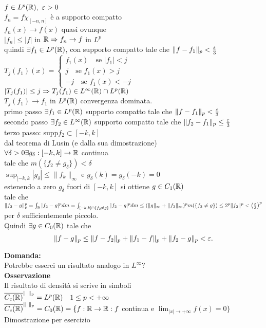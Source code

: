 \documentclass[12px]{article}
\begin{document}
	\begin{dimo}
		$f\in L^p(\mathbb{R}), \ \varepsilon > 0 $\\
		$f_n = f\chi_{[-n,n]}$ è a supporto compatto\\
		 $f_n(x) \rightarrow f(x)$ quasi ovunque\\
		 $|f_n| \leq |f|$ in  $\mathbb{R} \Rightarrow  f_n \rightarrow f$ in $L^p$\\
		 quindi  $\exists  f_1\in L^p(\mathbb{R})$, con supporto compatto tale che $\|f-f_1\|_p < \frac {\varepsilon} 3$ \\
		 $T_j(f_1)(x) = \begin{cases}
			 f_1 (x)\ \ \ \text{ se } |f_1| < j\\
			 j \ \ \ \text{ se } f_1(x) > j\\
			 -j \ \ \ \text{ se } f_1(x) < -j
		 \end{cases}$\\
		 $|T_j(f_1)|\leq j \Rightarrow  T_j (f_1)\in L^\infty (\mathbb{R})\cap L^p(\mathbb{R})$ \\
		 $T_j(f_1) \rightarrow f_1$ in $L^p(\mathbb{R})$ convergenza dominata.\\
		 primo passo  $\exists f_1\in L^p(\mathbb{R})$ supporto compatto tale che $\|f-f_1\|_p < \frac {\varepsilon} 3$\\
		 secondo passo $\exists f_2 \in L^\infty(\mathbb{R})$ supporto compatto tale che $\|f_2- f_1\|_p \leq \frac{\varepsilon} 3$\\
		 terzo passo: supp$f_2\subset [-k,k]$\\
		 dal teorema di Lusin (e dalla sua dimostrazione)\\
		 $\forall \delta > 0 \exists g_\delta : [-k,k] \rightarrow \mathbb{R}$ continua\\
	 tale che $m(\{f_2\neq g_\delta\}) < \delta$\\
	 $\sup_{[-k,k}|g_\delta|\leq \|f_k\|_\infty$ e  $g_\delta(k) = g_\delta(-k) = 0$\\
	 estenendo a zero $g_\delta$ fuori di  $[-k,k]$ si ottiene  $g\in C_1(\mathbb{R})$\\
	 tale che $\|f_2 - g\|_p^p = \int_{\mathbb{R}} |f_2-g|^pd m = \int_{[-k,k]\cap\{f_2\neq g\}}|f_2-g|^pd m \leq (\|g\|_\infty + \|f_2\|_\infty)^p m (\{f_2\neq g\}) \leq 2^p\|f_2\|^p < \left(\frac {\varepsilon} 3 \right)^p$ per $\delta$ sufficientemente piccolo.\\
	 Quindi  $\exists g\in C_0(\mathbb{R})$ tale che 
	 \[
	 \|f-g\|_p\leq \|f-f_2\|_p + \|f_1-f\|_p + \|f_2-g\|_p < \varepsilon
	 .\] 

	\end{dimo}
	\textbf{Domanda:}\\
	Potrebbe esserci un risultato analogo in $L^\infty$?\\
	 \textbf{Osservazione}\\
	 Il risultato di densità si scrive in simboli\\
	 $\overline{C_c(\mathbb{R})}^{\|\ \|_p} = L^p(\mathbb{R})$ \  $1\leq p < +\infty$ \\
	 $\overline{C_c(\mathbb{R})}^{\|\ \|_p} = C_0(\mathbb{R}) = \{f: \mathbb{R} \rightarrow \mathbb{R}: f$ continua e $\lim_{|x| \rightarrow +\infty} f(x) =0 \}$ \\
	 Dimostrazione per esercizio
	
\end{document}
